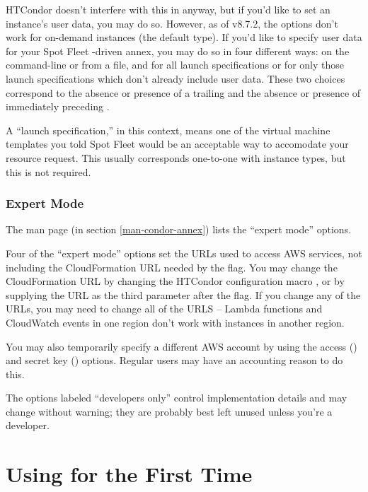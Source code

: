 HTCondor doesn't interfere with this in anyway, but if you'd like to set
an instance's user data, you may do so.  However, as of v8.7.2, the
 options don't work for on-demand instances (the default
type).  If you'd like to specify user data for your Spot Fleet -driven
annex, you may do so in four different ways: on the command-line or
from a file, and for all launch specifications or for only those launch
specifications which don't already include user data.  These two choices
correspond to the absence or presence of a trailing  and the
absence or presence of  immediately preceding .

A ``launch specification,'' in this context, means one of the virtual machine
templates you told Spot Fleet would be an acceptable way to accomodate your
resource request.  This usually corresponds one-to-one with instance types,
but this is not required.

\subsubsection{Expert Mode}

The man page (in section \ref{man-condor-annex}) lists the ``expert
mode'' options.

Four of the ``expert mode'' options set the URLs used to access AWS services,
not including the CloudFormation URL needed by the  flag.  You
may change the CloudFormation URL by changing the HTCondor configuration
macro , or by supplying the URL as the third
parameter after the  flag.  If you change any of the URLs,
you may need to change all of the URLS -- Lambda functions and CloudWatch
events in one region don't work with instances in another region.

You may also temporarily specify a different AWS account by using the
access () and
secret key () options.  Regular users may have
an accounting reason to do this.

The options labeled ``developers only'' control implementation details and
may change without warning; they are probably best left unused unless you're
a developer.


\section{Using  for the First Time}
\label{sec:clouds-annex-first-time}

